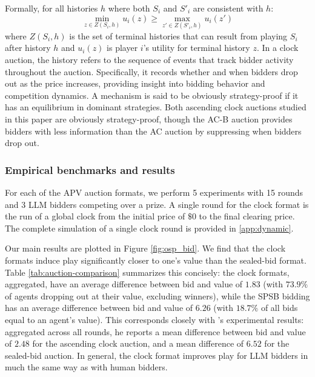 \documentclass{article} %
\newcommand{\kibitz}[2]{\ifnum\Comments=1{\color{#1}{#2}}\fi}
\newcommand{\dcp}[1]{\kibitz{teal}{[DCP: #1]}}
\begin{document}
Formally, for all histories $h$ where both $S_i$ and $S'_i$ are consistent with $h$:
\begin{equation*}
\min_{z \in Z(S_i, h)} u_i(z) \geq \max_{z' \in Z(S'_i, h)} u_i(z')
\end{equation*}
where $Z(S_i, h)$ is the set of terminal histories that can result from playing $S_i$ after history $h$ and
$u_i(z)$ is player $i$'s utility for terminal history $z$.  
In a clock auction, the history refers to the sequence of events that track bidder activity throughout the auction. Specifically, it records whether and when bidders drop out as the price increases, providing insight into bidding behavior and competition dynamics. A mechanism is said to be obviously strategy-proof if it has an equilibrium in dominant strategies.  Both ascending clock auctions studied in this paper are obviously strategy-proof, though the AC-B auction provides bidders with less information than the AC auction by suppressing when bidders drop out.


\subsubsection{Empirical benchmarks and results}
For each of the APV auction formats, we perform 5 experiments with 15 rounds and 3 LLM bidders competing over a prize. A single round for the clock format is the run of a global clock from the initial price of $\$0$ to the final clearing price. The complete simulation of a single clock round is provided in \ref{app:dynamic}.

Our main results are plotted in Figure \ref{fig:osp_bid}. We find that the clock formats induce play significantly closer to one's value than the sealed-bid format. Table \ref{tab:auction-comparison} summarizes this concisely: the clock formats, aggregated, have an average difference between bid and value of $1.83$ (with $73.9\%$ of agents dropping out at their value, excluding winners), while the SPSB bidding has an average difference between bid and value of $6.26$ (with $18.7\%$ of all bids equal to an agent's value). This corresponds closely with \citet{li2017obviously}'s experimental results: aggregated across all rounds, he reports a mean difference between bid and value of $2.48$ for the ascending clock auction, and a mean difference of $6.52$ for the sealed-bid auction. In general, the clock format improves play for LLM bidders in much the same way as with human bidders.
\end{document}
